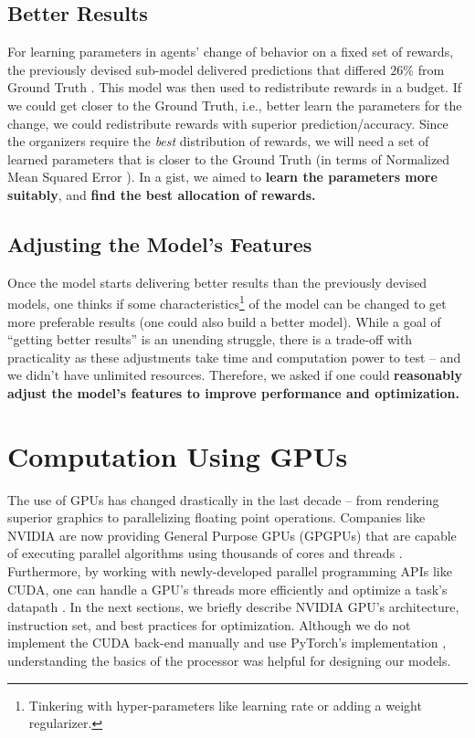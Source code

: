 \subsection{Better Results} \label{sec:Important Questions - Better Results}
For learning parameters in agents' change of behavior on a fixed set of rewards, the previously devised sub-model delivered predictions that differed $26\%$ from Ground Truth \cite[Table~1]{Xue2016Avi2}. This model was then used to redistribute rewards in a budget. If we could get closer to the Ground Truth, i.e., better learn the parameters for the change, we could redistribute rewards with superior prediction/accuracy. Since the organizers require the \textit{best} distribution of rewards, we will need a set of learned parameters that is closer to the Ground Truth (in terms of Normalized Mean Squared Error \cite[Section~4.2]{Xue2016Avi2}). In a gist, we aimed to \textbf{learn the parameters more suitably}, and \textbf{find the  best allocation of rewards.}

\subsection{Adjusting the Model's Features} \label{sec:Important Questions - Adjusting the Model's Features}
Once the model starts delivering better results than the previously devised models, one thinks if some characteristics\footnote{Tinkering with hyper-parameters like learning rate or adding a weight regularizer.} of the model can be changed to get more preferable results (one could also build a better model). While a goal of ``getting better results'' is an unending struggle, there is a trade-off with practicality as these adjustments take time and computation power to test -- and we didn't have unlimited resources. Therefore, we asked if one could \textbf{reasonably adjust the model's features to improve performance and optimization.}

\section{Computation Using GPUs} \label{sec:Computation Using GPUs}
The use of GPUs has changed drastically in the last decade -- from rendering superior graphics to parallelizing floating point operations. Companies like NVIDIA are now providing General Purpose GPUs (GPGPUs) that are capable of executing parallel algorithms using thousands of cores and threads \cite{NVIDIA}. Furthermore, by working with newly-developed parallel programming APIs like CUDA, one can handle a GPU's threads more efficiently and optimize a task's datapath \cite{CUDADocs}. In the next sections, we briefly describe NVIDIA GPU's architecture, instruction set, and best practices for optimization. Although we do not implement the CUDA back-end manually and use PyTorch's implementation \cite{PTDocs}, understanding the basics of the processor was helpful for designing our models.

